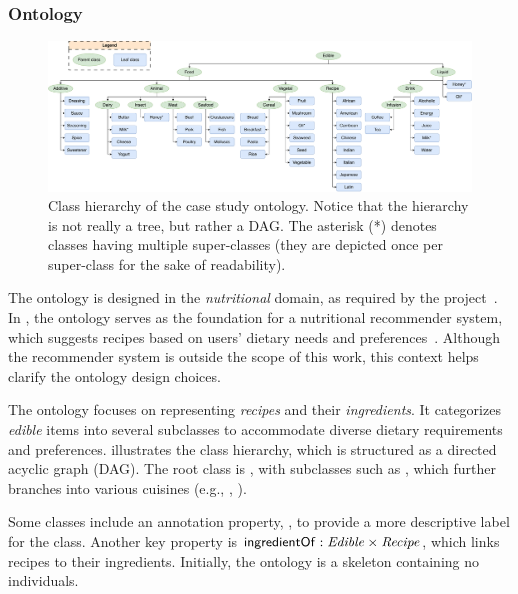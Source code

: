 \subsubsection{Ontology}
\label{subsubsec:kgfiller-ontology}
%
\begin{figure}
    \centering
    \includegraphics[width=\linewidth]{figures/kgfiller/ontology-skeleton}
    \caption[Class hierarchy of the ontology used in the experiments]{
        Class hierarchy of the case study ontology.
        Notice that the hierarchy is not really a tree, but rather a \gls{DAG}.
        The asterisk (*) denotes classes having multiple super-classes (they are depicted once per super-class for the sake of readability).
    }
    \label{fig:ontology}
\end{figure}
%
The ontology is designed in the \emph{nutritional} domain, as required by the \expectation{} project~\cite{expectation-extraamas2021}.
%
In \expectation{}, the ontology serves as the foundation for a nutritional recommender system, which suggests recipes based on users' dietary needs and preferences~\cite{DBLP:journals/cmpb/MagniniCCAO23}.
%
Although the recommender system is outside the scope of this work, this context helps clarify the ontology design choices.

%
The ontology focuses on representing \emph{recipes} and their \emph{ingredients}.
%
It categorizes \emph{edible} items into several subclasses to accommodate diverse dietary requirements and preferences.
%
 illustrates the class hierarchy, which is structured as a directed acyclic graph (DAG).
%
The root class is , with subclasses such as , which further branches into various cuisines (e.g., , ).

%
Some classes include an annotation property, , to provide a more descriptive label for the class.
%
Another key property is $\relation{ingredientOf} : \concept{Edible} \times \concept{Recipe}$, which links recipes to their ingredients.
%
Initially, the ontology is a skeleton containing no individuals.


